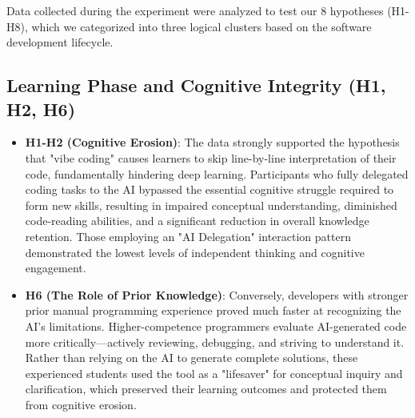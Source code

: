 \documentclass[../tanulmany.tex]{subfiles}
\begin{document}
Data collected during the experiment were analyzed to test our 8 hypotheses (H1-H8), 
which we categorized into three logical clusters based on the software development lifecycle.

\subsection{Learning Phase and Cognitive Integrity (H1, H2, H6)}
\begin{itemize}
    \item \textbf{H1-H2 (Cognitive Erosion)}: The data strongly supported the hypothesis that "vibe coding" causes learners to skip line-by-line interpretation of their code, 
    fundamentally hindering deep learning. Participants who fully delegated coding tasks to the AI bypassed the essential cognitive struggle required to form new skills, 
    resulting in impaired conceptual understanding, diminished code-reading abilities, and a significant reduction in overall knowledge retention. 
    Those employing an "AI Delegation" interaction pattern demonstrated the lowest levels of independent thinking and cognitive engagement. \cite{shen2026how}
    \item \textbf{H6 (The Role of Prior Knowledge)}: Conversely, developers with stronger prior manual programming experience proved much faster at recognizing the AI's limitations. 
    Higher-competence programmers evaluate AI-generated code more critically—actively reviewing, debugging, and striving to understand it. Rather than relying on the AI to 
    generate complete solutions, these experienced students used the tool as a "lifesaver" for conceptual inquiry and clarification, which preserved their learning outcomes 
    and protected them from cognitive erosion. \cite{kusper2025we} \cite{shen2026how}
\end{itemize}
\end{document}
